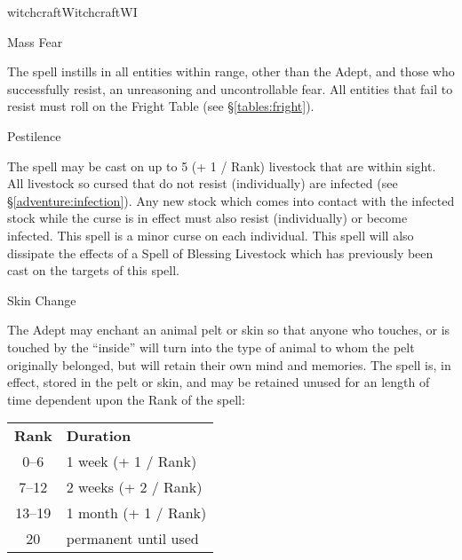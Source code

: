 \begin{college}[1.1]{witchcraft}{Witchcraft}{WI}
\begin{spell}[S-15]{Mass Fear}
\begin{effects}
The spell instills in all entities within range, other than the Adept,
and those who successfully resist, an unreasoning and uncontrollable
fear.  All entities that fail to resist must roll on the Fright Table
(see \S\ref{tables:fright}).
\end{effects}
\end{spell}

\begin{spell}[S-16]{Pestilence}

\begin{effects}
The spell may be cast on up to 5 (+ 1 / Rank) livestock that are
within sight.  All livestock so cursed that do not resist
(individually) are infected (see \S\ref{adventure:infection}).  Any
new stock which comes into contact with the infected stock while the
curse is in effect must also resist (individually) or become infected.
This spell is a minor curse on each individual.  This spell will also
dissipate the effects of a Spell of Blessing Livestock which has
previously been cast on the targets of this spell.
\end{effects}
\end{spell}

\begin{spell}[S-17]{Skin Change}

\begin{effects}
The Adept may enchant an animal pelt or skin so that anyone who
touches, or is touched by the ``inside'' will turn into the type of
animal to whom the pelt originally belonged, but will retain their own
mind and memories.  The spell is, in effect, stored in the pelt or
skin, and may be retained unused for an length of time dependent upon
the Rank of the spell:

\begin{tabular}{cl}
\textbf{Rank} & \textbf{Duration} \\
0--6	& 1 week (+ 1 / Rank) \\
7--12	& 2 weeks (+ 2 / Rank) \\
13--19	& 1 month (+ 1 / Rank) \\
20	& permanent until used \\
\end{tabular}


\end{effects}
\end{spell}
\end{college}
